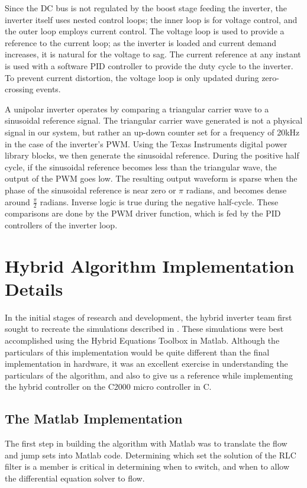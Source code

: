 Since the DC bus is not regulated by the boost stage feeding the inverter, the inverter itself uses nested control loops; the inner loop is for voltage control, and the outer loop employs current control. The voltage loop is used to provide a reference to the current loop; as the inverter is loaded and current demand increases, it is natural for the voltage to sag. The current reference at any instant is used with a software PID controller to provide the duty cycle to the inverter. To prevent current distortion, the voltage loop is only updated during zero-crossing events.

A unipolar inverter operates by comparing a triangular carrier wave to a sinusoidal reference signal. The triangular carrier wave generated is not a physical signal in our system, but rather an up-down counter set for a frequency of 20kHz in the case of the inverter's PWM. Using the Texas Instruments digital power library blocks, we then generate the sinusoidal reference. During the positive half cycle, if the sinusoidal reference becomes less than the triangular wave, the output of the PWM goes low. The resulting output waveform is sparse when the phase of the sinusoidal reference is near zero or $\pi$ radians, and becomes dense around $\frac{\pi}{2}$ radians. Inverse logic is true during the negative half-cycle. These comparisons are done by the PWM driver function, which is fed by the PID controllers of the inverter loop.

\section{Hybrid Algorithm Implementation Details}
In the initial stages of research and development, the hybrid inverter team first sought to recreate the simulations described in \cite{ricardo}. These simulations were best accomplished using the Hybrid Equations Toolbox in Matlab. Although the particulars of this implementation would be quite different than the final implementation in hardware, it was an excellent exercise in understanding the particulars of the algorithm, and also to give us a reference while implementing the hybrid controller on the C2000 micro controller in C. 

\subsection{The Matlab Implementation}
The first step in building the algorithm with Matlab was to translate the flow and jump sets into Matlab code. Determining which set the solution of the RLC filter is a member is critical in determining when to switch, and when to allow the differential equation solver to flow. 

